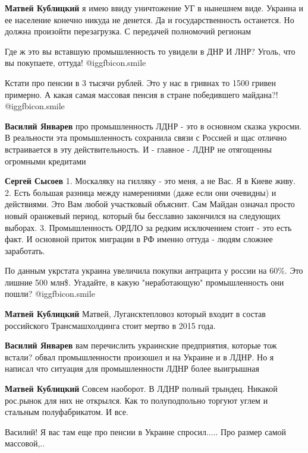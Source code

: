 \begin{itemize}
\begin{itemize}
\textbf{Матвей Кублицкий} я имею ввиду уничтожение УГ в нынешнем виде. Украина и ее население конечно никуда не денется. Да и государственность останется. Но должна произойти перезагрузка. С передачей полномочий регионам


Где ж это вы вставшую промышленность то увидели в ДНР И ЛНР?
Уголь, что вы покупаете, оттуда!
 @igg{fbicon.smile} 

Кстати про пенсии в 3 тысячи рублей.
Это у нас в гривнах то 1500 гривен примерно.
А какая самая массовая пенсия в стране победившего майдана?!
 @igg{fbicon.smile} 

\textbf{Василий Январев} про промышленность ЛДНР - это в основном сказка укросми. В реальности эта промышленность сохранила связи с Россией и щас отлично встраивается в эту действительность. И - главное - ЛДНР не отягощенны огромными кредитами

\textbf{Сергей Сысоев} 1. Москаляку на гилляку - это меня, а не Вас. Я в Киеве живу. 2. Есть большая разница между намерениями (даже если они очевидны) и действиями. Это Вам любой участковый объяснит. Сам Майдан означал просто новый оранжевый период, который бы бесславно закончился на следующих выборах. 3. Промышленность ОРДЛО за редким исключением стоит - это есть факт. И основной приток миграции в РФ именно оттуда - людям сложнее заработать.


По данным укрстата украина увеличила покупки антрацита у россии на 60\%.
Это лишние 500 млн\$.
Угадайте, в какую "неработающую" промышленность они пошли?
 @igg{fbicon.smile} 

\textbf{Матвей Кублицкий} Матвей, Лугансктепловоз который входит в состав российского Трансмашхолдинга стоит мертво в 2015 года.

\textbf{Василий Январев} вам перечислить украинские предприятия, которые тож встали? обвал промышленности произошел и на Украине и в ЛДНР. Но я написал что ситуация для промышленности ЛДНР более выигрышная

\textbf{Матвей Кублицкий} Совсем наоборот. В ЛДНР полный трындец. Никакой рос.рынок для них не открылся. Как то полуподпольно торгуют углем и стальным полуфабрикатом. И все.

Василий!
Я вас там еще про пенсии в Украине спросил.....
Про размер самой массовой,..


\end{itemize}
\end{itemize}
